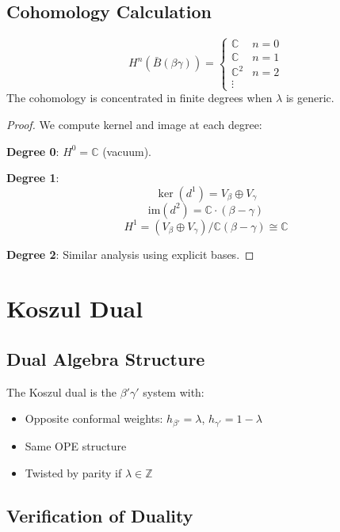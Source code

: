 \subsection{Cohomology Calculation}

\begin{theorem}
$$H^n(\bar{B}(\beta\gamma)) = \begin{cases}
\mathbb{C} & n = 0 \\
\mathbb{C} & n = 1 \\
\mathbb{C}^2 & n = 2 \\
\vdots
\end{cases}$$
The cohomology is concentrated in finite degrees when $\lambda$ is generic.
\end{theorem}

\begin{proof}
We compute kernel and image at each degree:

\textbf{Degree 0}: $H^0 = \mathbb{C}$ (vacuum).

\textbf{Degree 1}: 
$$\ker(d^1) = V_\beta \oplus V_\gamma$$
$$\text{im}(d^2) = \mathbb{C} \cdot (\beta - \gamma)$$
$$H^1 = (V_\beta \oplus V_\gamma)/\mathbb{C}(\beta - \gamma) \cong \mathbb{C}$$

\textbf{Degree 2}: Similar analysis using explicit bases.
\end{proof}

\section{Koszul Dual}

\subsection{Dual Algebra Structure}

\begin{theorem}
The Koszul dual is the $\beta'\gamma'$ system with:
\begin{itemize}
\item Opposite conformal weights: $h_{\beta'} = \lambda$, $h_{\gamma'} = 1 - \lambda$
\item Same OPE structure
\item Twisted by parity if $\lambda \in \mathbb{Z}$
\end{itemize}
\end{theorem}

\subsection{Verification of Duality}

